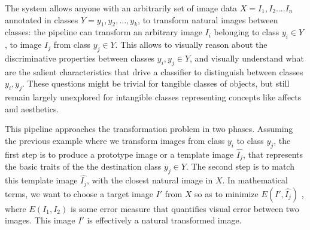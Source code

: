 The system allows anyone with an arbitrarily set of  image data $ X = { I_1, I_2 ... . I_n  }$ annotated in classes $Y = {y_1 , y_2 , ... ,y_k}$, to transform natural images between classes: the pipeline can transform an arbitrary image $I_i$ belonging to class $y_i \in Y$ , to image $I_j$ from class $y_j \in Y$.  This allows  to visually reason about the discriminative properties between classes $y_i , y_j \in Y$, and visually understand what are the salient characteristics %
that drive a classifier to distinguish between  classes $y_i,y_j$. These questions might be trivial for tangible classes of objects, but still remain largely unexplored for intangible classes representing concepts like affects and aesthetics.
\par 
This pipeline approaches the transformation problem in two phases. Assuming the previous example where we transform images from class $y_i$ to class $y_j$, the first step is to produce a prototype image or a template image $\hat{I_j}$, that represents the basic traits of the %
the destination class $y_j \in Y$. The second step is to 
match this template image $\hat{I_j}$, 
with the closest natural image in $X$.
 In mathematical terms, we want to choose a target image $I'$ from $X$ so as to minimize $E(I' , \hat{I_j} )$ , where $E(I_1, I_2)$ is some error measure that quantifies visual error between two images. This image $I'$ is effectively a natural transformed image.
